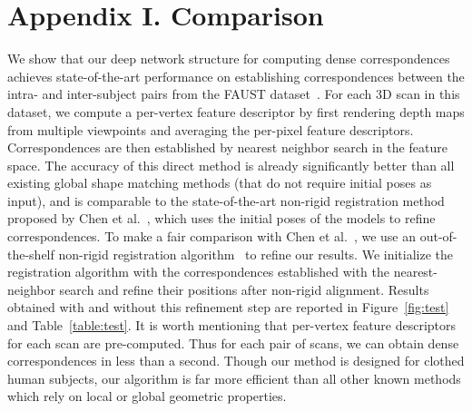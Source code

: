 \documentclass[10pt,twocolumn,letterpaper]{article}
\begin{document}
\section*{Appendix I. Comparison}
We show that our deep network structure for computing dense correspondences achieves state-of-the-art performance on establishing correspondences between the intra- and inter-subject pairs from the FAUST dataset~\cite{Bogo:CVPR:2014}. For each 3D scan in this dataset, we compute a per-vertex feature descriptor by first rendering depth maps from multiple viewpoints and averaging the per-pixel feature descriptors. %
Correspondences are then established by nearest neighbor search in the feature space. The accuracy of this direct method is already significantly better than all existing global shape matching methods (that do not require initial poses as input), and is comparable to the state-of-the-art non-rigid registration method proposed by Chen et al.~\cite{chen15}, which uses the initial poses of the models to refine correspondences. To make a fair comparison with Chen et al.~\cite{chen15}, we use an out-of-the-shelf non-rigid registration algorithm~\cite{li08global} to refine our results. We initialize the registration algorithm with the correspondences established with the nearest-neighbor search and refine their positions after non-rigid alignment. Results obtained with and without this refinement step are reported in Figure~\ref{fig:test} and Table~\ref{table:test}.
It is worth mentioning that per-vertex feature descriptors for each scan are pre-computed. Thus for each pair of scans, we can obtain dense correspondences in less than a second. Though our method is designed for clothed human subjects, our algorithm is far more efficient than all other known methods which rely on local or global geometric properties.
\end{document}
